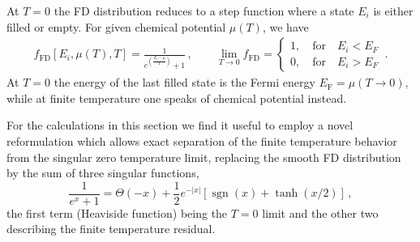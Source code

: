 \documentclass[sn-mathphys,Numbered]{sn-jnl}
\DeclareMathOperator{\sgn}{sgn}
\begin{document}
At $T=0$ the FD distribution reduces to a step function where a state $E_{i}$ is either filled or empty. For given chemical potential $\mu(T)$, we have
\begin{align}
\label{f_old}
f_\mathrm{FD}[E_{i},\mu(T),T]=\frac{1}{\displaystyle e^{\left(\frac{E_{i}-\mu}{T}\right)}+1}\,,\qquad 
\lim_{T\to0}f_\mathrm{FD}=\left\{
\begin{array}{c}
1,\quad\mathrm{for}\quad{E_{i}}<{ E_F}\\
0,\quad\mathrm{for}\quad{E_{i}}>{ E_F}
\end{array}
\right.\,.
\end{align}
At $T=0$ the energy of the last filled state is the Fermi energy ${E_\mathrm{F}=\mu(T\to0)}$, while at finite temperature one speaks of chemical potential instead. 

For the calculations in this section we find it useful to employ a novel reformulation which allows exact separation of the finite temperature behavior from the singular zero temperature limit,  replacing the smooth FD distribution by the sum of three singular functions,
\begin{equation}
\frac{1}{e^{x} +1}=\Theta(-x)+\frac{1}{2}e^{-|x|}\left[\sgn(x)+\tanh(x/2)\right]\,,
\end{equation}
the first term (Heaviside function) being the $T=0$ limit and  the other two describing the finite temperature residual. 
\end{document}
